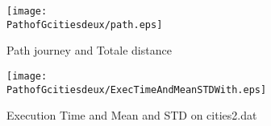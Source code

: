 \begin{figure}[H]
	\begin{minipage}[t]{0.45\linewidth}
	\centering
	\texttt{[image: \\PathofGcitiesdeux/path.eps]}
	\caption{Path journey and Totale distance}\label{fig:PathofGcitiesdeux:path}
	
	\end{minipage}\hfill
	\begin{minipage}[t]{0.45\linewidth}
	\centering
	\texttt{[image: \\PathofGcitiesdeux/ExecTimeAndMeanSTDWith.eps]}
	\caption{Execution Time and Mean and STD on cities2.dat}
	\label{fig:PathofGcitiesdeux:AS_1_5AS_ExecTimeAndMeanSTDWith_execVariation}
	\end{minipage}
\end{figure}